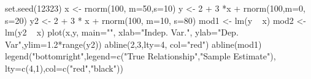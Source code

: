 \begin{Schunk}
\begin{Sinput}
 set.seed(12323)
 x <- rnorm(100, m=50,s=10)
 y <-  2 + 3 *x + rnorm(100,m=0, s=20)
 y2 <- 2 + 3 * x + rnorm(100, m=10, s=80)
 mod1 <- lm(y ~ x)
 mod2 <- lm(y2 ~ x)
 plot(x,y, main="", xlab="Indep. Var.", ylab="Dep. Var",ylim=1.2*range(y2))
 abline(2,3,lty=4, col="red")
 abline(mod1)
 legend("bottomright",legend=c("True Relationship","Sample Estimate"), lty=c(4,1),col=c("red","black"))
\end{Sinput}
\end{Schunk}
